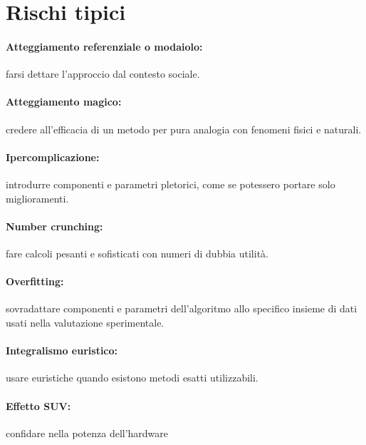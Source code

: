 \documentclass[\main/main.tex]{subfiles}
\begin{document}
\section{Rischi tipici}
\begin{multicols}{2}
  \paragraph*{Atteggiamento referenziale o modaiolo:} farsi dettare l'approccio dal contesto sociale.
  \paragraph*{Atteggiamento magico:} credere all'efficacia di un metodo per pura analogia con fenomeni fisici e naturali.
  \paragraph*{Ipercomplicazione:} introdurre componenti e parametri pletorici, come se potessero portare solo miglioramenti.
  \paragraph*{Number crunching:} fare calcoli pesanti e sofisticati con numeri di dubbia utilità.
  \paragraph*{Overfitting:} sovradattare componenti e parametri dell'algoritmo allo specifico insieme di dati usati nella valutazione sperimentale.
  \paragraph*{Integralismo euristico:} usare euristiche quando esistono metodi esatti utilizzabili.
  \paragraph*{Effetto SUV:} confidare nella potenza dell'hardware
\end{multicols}
\end{document}
